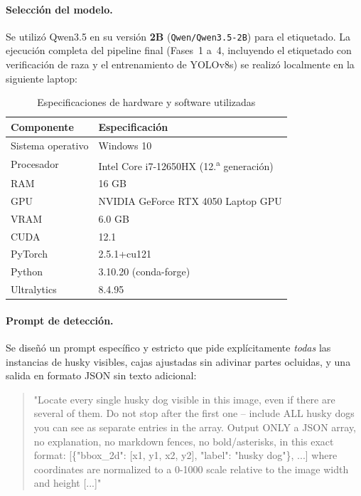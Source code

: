 \documentclass[11pt]{article}
\begin{document}
\paragraph{Selección del modelo.} Se utilizó Qwen3.5 en su versión \textbf{2B}
(\texttt{Qwen/Qwen3.5-2B}) para el etiquetado. La ejecución completa del pipeline final
(Fases~1 a~4, incluyendo el etiquetado con verificación de raza y el entrenamiento de YOLOv8s)
se realizó localmente en la siguiente laptop:

\begin{table}[H]
\centering
\caption{Especificaciones de hardware y software utilizadas}
\label{tab:specs}
\begin{tabular}{ll}
\toprule
\textbf{Componente} & \textbf{Especificación} \\
\midrule
Sistema operativo & Windows 10 \\
Procesador        & Intel Core i7-12650HX (12.\textsuperscript{a} generación) \\
RAM               & 16 GB \\
GPU               & NVIDIA GeForce RTX 4050 Laptop GPU \\
VRAM              & 6.0 GB \\
CUDA              & 12.1 \\
PyTorch           & 2.5.1+cu121 \\
Python            & 3.10.20 (conda-forge) \\
Ultralytics       & 8.4.95 \\
\bottomrule
\end{tabular}
\end{table}

\paragraph{Prompt de detección.} Se diseñó un prompt específico y estricto que pide
explícitamente \emph{todas} las instancias de husky visibles, cajas ajustadas sin adivinar
partes ocluidas, y una salida en formato JSON sin texto adicional:

\begin{quote}
\small\ttfamily
"Locate every single husky dog visible in this image, even if there are several of them. Do
not stop after the first one -- include ALL husky dogs you can see as separate entries in the
array. Output ONLY a JSON array, no explanation, no markdown fences, no bold/asterisks, in this
exact format: [\{"bbox\_2d": [x1, y1, x2, y2], "label": "husky dog"\}, ...] where coordinates
are normalized to a 0-1000 scale relative to the image width and height [...]"
\end{quote}
\end{document}
